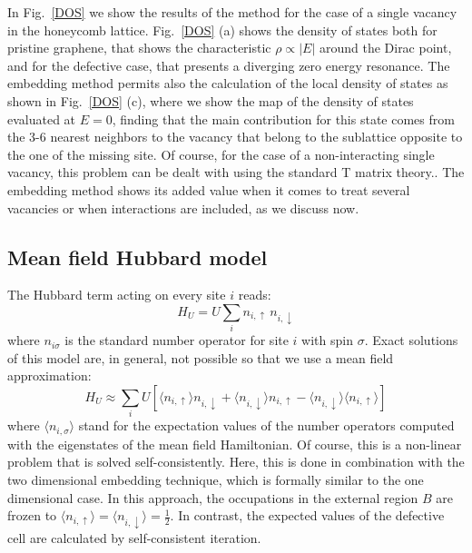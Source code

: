 In Fig.~\ref{DOS} we show the results of the method for the case of a single vacancy in the honeycomb lattice. Fig.~\ref{DOS} (a) shows the density of states both for pristine graphene, that shows the characteristic $\rho \propto |E|$ around the Dirac point,\cite{Katsnelson2012} and for the defective case, that presents a diverging zero energy resonance. The embedding method permits also the calculation of the local density of states as shown in Fig.~\ref{DOS} (c), where we show the map of the density of states evaluated at $E=0$, finding that the main contribution for this state comes from the 3-6 nearest neighbors to the vacancy that belong to the sublattice opposite to the one of the missing site.\cite{Pereira2006,kumazaki2007,Wehling2007,Pereira2008,Palacios2008}
Of course, for the case of a non-interacting single vacancy, this problem can be dealt with using the standard T matrix theory.\cite{libro-Economou,Gonzalez2012,Wehling2007}. The embedding method shows its added value when it comes to treat several vacancies or when interactions are included, as we discuss now.


\subsection{Mean field Hubbard model }
The Hubbard term acting on every site $i$ reads:
\begin{equation}
  H_{U} = U \sum_i n_{i,\uparrow}\,n_{i,\downarrow}
\end{equation}
where $n_{i\sigma}$ is the standard number operator for site $i$ with spin $\sigma$.
Exact solutions of this model are, in general, not possible so that we use a mean field approximation:
\begin{equation}
  H_{U} \approx \sum_i
  U \left[\langle n_{i,\uparrow} \rangle n_{i,\downarrow} +
    \langle n_{i,\downarrow} \rangle n_{i,\uparrow}  -
    \langle n_{i,\downarrow} \rangle \langle n_{i,\uparrow} \rangle
  \right]
\end{equation}
where $\langle n_{i,\sigma} \rangle$ stand for the expectation values of the number operators computed with the eigenstates of the mean field Hamiltonian.
Of course, this is a non-linear problem that is solved self-consistently.  Here, this is done in combination with the two dimensional embedding technique, which is formally similar to the one dimensional case.\cite{munoz2009}
In this approach, the occupations in the external region $B$ are frozen to $\langle n_{i,\uparrow}\rangle= \langle n_{i,\downarrow}\rangle=\frac{1}{2}$.  In contrast, the expected values of the defective cell are calculated by self-consistent iteration.



